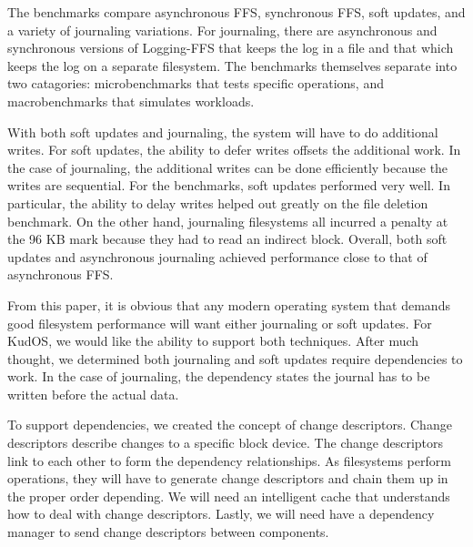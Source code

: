 The benchmarks compare asynchronous FFS, synchronous FFS, soft
updates, and a variety of journaling variations. For journaling, there
are asynchronous and synchronous versions of Logging-FFS that keeps
the log in a file and that which keeps the log on a separate
filesystem. The benchmarks themselves separate into two catagories:
microbenchmarks that tests specific operations, and macrobenchmarks
that simulates workloads.

With both soft updates and journaling, the system will have to do
additional writes. For soft updates, the ability to defer writes
offsets the additional work. In the case of journaling, the additional
writes can be done efficiently because the writes are sequential. For
the benchmarks, soft updates performed very well. In particular, the
ability to delay writes helped out greatly on the file deletion
benchmark. On the other hand, journaling filesystems all incurred a
penalty at the 96 KB mark because they had to read an indirect
block. Overall, both soft updates and asynchronous journaling achieved
performance close to that of asynchronous FFS.

From this paper, it is obvious that any modern operating system that
demands good filesystem performance will want either journaling or
soft updates. For KudOS, we would like the ability to support both
techniques. After much thought, we determined both journaling and soft
updates require dependencies to work. In the case of journaling, the
dependency states the journal has to be written before the actual
data.

To support dependencies, we created the concept of change
descriptors. Change descriptors describe changes to a specific block
device. The change descriptors link to each other to form the
dependency relationships. As filesystems perform operations, they will
have to generate change descriptors and chain them up in the proper
order depending. We will need an intelligent cache that understands
how to deal with change descriptors. Lastly, we will need have a
dependency manager to send change descriptors between components.
